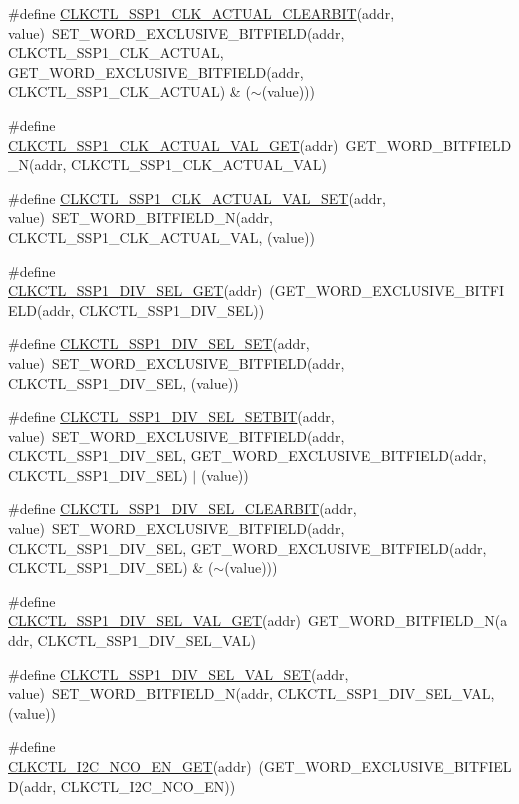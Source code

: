 \begin{DoxyCompactItemize}
\item 
\#define \hyperlink{a00544_a34ffc2fb3a14d44c04456c56a8f700cb}{CLKCTL\_\-SSP1\_\-CLK\_\-ACTUAL\_\-CLEARBIT}(addr, value)~SET\_\-WORD\_\-EXCLUSIVE\_\-BITFIELD(addr, CLKCTL\_\-SSP1\_\-CLK\_\-ACTUAL, GET\_\-WORD\_\-EXCLUSIVE\_\-BITFIELD(addr, CLKCTL\_\-SSP1\_\-CLK\_\-ACTUAL) \& ($\sim$(value)))
\item 
\#define \hyperlink{a00544_a3e753d86f8e7ae4e77228aa0f1fb4259}{CLKCTL\_\-SSP1\_\-CLK\_\-ACTUAL\_\-VAL\_\-GET}(addr)~GET\_\-WORD\_\-BITFIELD\_\-N(addr, CLKCTL\_\-SSP1\_\-CLK\_\-ACTUAL\_\-VAL)
\item 
\#define \hyperlink{a00544_a3c04fb288c1af217d86711b64b8d275f}{CLKCTL\_\-SSP1\_\-CLK\_\-ACTUAL\_\-VAL\_\-SET}(addr, value)~SET\_\-WORD\_\-BITFIELD\_\-N(addr, CLKCTL\_\-SSP1\_\-CLK\_\-ACTUAL\_\-VAL, (value))
\item 
\#define \hyperlink{a00544_a12a67c5f87e468524c2d6a198dc4ea72}{CLKCTL\_\-SSP1\_\-DIV\_\-SEL\_\-GET}(addr)~(GET\_\-WORD\_\-EXCLUSIVE\_\-BITFIELD(addr, CLKCTL\_\-SSP1\_\-DIV\_\-SEL))
\item 
\#define \hyperlink{a00544_aae28a5e62cb0b260fe6bef1dc393d6db}{CLKCTL\_\-SSP1\_\-DIV\_\-SEL\_\-SET}(addr, value)~SET\_\-WORD\_\-EXCLUSIVE\_\-BITFIELD(addr, CLKCTL\_\-SSP1\_\-DIV\_\-SEL, (value))
\item 
\#define \hyperlink{a00544_ae5b4fa2c274a170b07602290064d808e}{CLKCTL\_\-SSP1\_\-DIV\_\-SEL\_\-SETBIT}(addr, value)~SET\_\-WORD\_\-EXCLUSIVE\_\-BITFIELD(addr, CLKCTL\_\-SSP1\_\-DIV\_\-SEL, GET\_\-WORD\_\-EXCLUSIVE\_\-BITFIELD(addr, CLKCTL\_\-SSP1\_\-DIV\_\-SEL) $|$ (value))
\item 
\#define \hyperlink{a00544_a543d7fdafbfc5da6647463873e300dad}{CLKCTL\_\-SSP1\_\-DIV\_\-SEL\_\-CLEARBIT}(addr, value)~SET\_\-WORD\_\-EXCLUSIVE\_\-BITFIELD(addr, CLKCTL\_\-SSP1\_\-DIV\_\-SEL, GET\_\-WORD\_\-EXCLUSIVE\_\-BITFIELD(addr, CLKCTL\_\-SSP1\_\-DIV\_\-SEL) \& ($\sim$(value)))
\item 
\#define \hyperlink{a00544_ac7db5e2fbb34de2f586535f37baf191a}{CLKCTL\_\-SSP1\_\-DIV\_\-SEL\_\-VAL\_\-GET}(addr)~GET\_\-WORD\_\-BITFIELD\_\-N(addr, CLKCTL\_\-SSP1\_\-DIV\_\-SEL\_\-VAL)
\item 
\#define \hyperlink{a00544_a089f87c19a5de667e851ab2ac521065c}{CLKCTL\_\-SSP1\_\-DIV\_\-SEL\_\-VAL\_\-SET}(addr, value)~SET\_\-WORD\_\-BITFIELD\_\-N(addr, CLKCTL\_\-SSP1\_\-DIV\_\-SEL\_\-VAL, (value))
\item 
\#define \hyperlink{a00544_a0426a1ec2f0471995c9fadb33f41e6c5}{CLKCTL\_\-I2C\_\-NCO\_\-EN\_\-GET}(addr)~(GET\_\-WORD\_\-EXCLUSIVE\_\-BITFIELD(addr, CLKCTL\_\-I2C\_\-NCO\_\-EN))

\end{DoxyCompactItemize}
